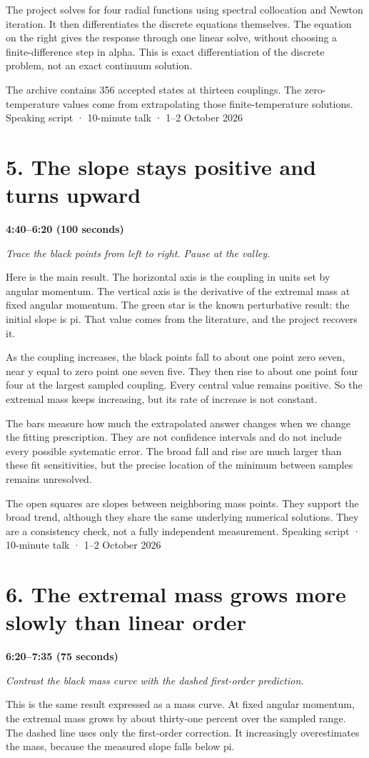 \documentclass[12pt,a4paper]{article}
\begin{document}
The project solves for four radial functions using spectral collocation and Newton iteration. It then differentiates the discrete equations themselves. The equation on the right gives the response through one linear solve, without choosing a finite-difference step in alpha. This is exact differentiation of the discrete problem, not an exact continuum solution.

The archive contains 356 accepted states at thirteen couplings. The zero-temperature values come from extrapolating those finite-temperature solutions.
\newpage
{\small Speaking script · 10-minute talk · 1--2 October 2026}\par
\section*{5. The slope stays positive and turns upward}
\textbf{4:40--6:20 (100 seconds)}\par
{\itshape Trace the black points from left to right. Pause at the valley.}\par\medskip
Here is the main result. The horizontal axis is the coupling in units set by angular momentum. The vertical axis is the derivative of the extremal mass at fixed angular momentum. The green star is the known perturbative result: the initial slope is pi. That value comes from the literature, and the project recovers it.

As the coupling increases, the black points fall to about one point zero seven, near y equal to zero point one seven five. They then rise to about one point four four at the largest sampled coupling. Every central value remains positive. So the extremal mass keeps increasing, but its rate of increase is not constant.

The bars measure how much the extrapolated answer changes when we change the fitting prescription. They are not confidence intervals and do not include every possible systematic error. The broad fall and rise are much larger than these fit sensitivities, but the precise location of the minimum between samples remains unresolved.

The open squares are slopes between neighboring mass points. They support the broad trend, although they share the same underlying numerical solutions. They are a consistency check, not a fully independent measurement.
\newpage
{\small Speaking script · 10-minute talk · 1--2 October 2026}\par
\section*{6. The extremal mass grows more slowly than linear order}
\textbf{6:20--7:35 (75 seconds)}\par
{\itshape Contrast the black mass curve with the dashed first-order prediction.}\par\medskip
This is the same result expressed as a mass curve. At fixed angular momentum, the extremal mass grows by about thirty-one percent over the sampled range. The dashed line uses only the first-order correction. It increasingly overestimates the mass, because the measured slope falls below pi.
\end{document}
